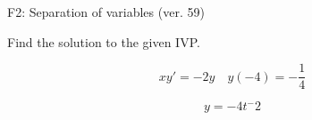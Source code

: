 \begin{exercise}
  \begin{exerciseTitle}F2: Separation of variables (ver. 59)\end{exerciseTitle}
  \begin{exerciseStatement}
    
Find the solution to the given IVP.

    
\[xy'= -2 y \hspace{1em} y( -4 ) = -\frac{1}{4}\]

  \end{exerciseStatement}
  \begin{exerciseAnswer}
    
\[y= -4 t^ -2\]

  \end{exerciseAnswer}
\end{exercise}
